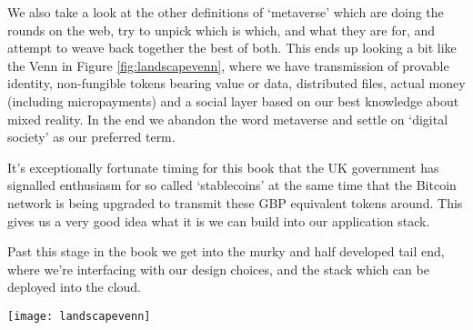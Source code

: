 We also take a look at the other definitions of `metaverse' which are doing the rounds on the web, try to unpick which is which, and what they are for, and attempt to weave back together the best of both. This ends up looking a bit like the Venn in Figure \ref{fig:landscapevenn}, where we have transmission of provable identity, non-fungible tokens bearing value or data, distributed files, actual money (including micropayments) and a social layer based on our best knowledge about mixed reality. In the end we abandon the word metaverse and settle on `digital society' as our preferred term.\par
It's exceptionally fortunate timing for this book that the UK government has signalled enthusiasm for so called `stablecoins' at the same time that the Bitcoin network is being upgraded to transmit these GBP equivalent tokens around. This gives us a very good idea what it is we can build into our application stack.\par 
Past this stage in the book we get into the murky and half developed tail end, where we’re interfacing with our design choices, and the stack which can be deployed into the cloud.
\begin{figure*}[ht]\centering %
	\texttt{[image: landscapevenn]}
	\caption{Web 3, Metaverse, and Bitcoin are intersectional technologies.}
	\label{fig:landscapevenn}
\end{figure*}

